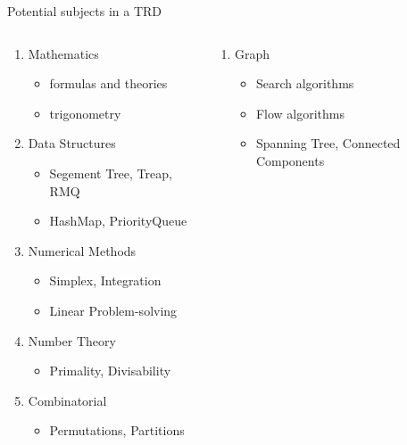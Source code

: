 \documentclass[11pt,pdf, aspectratio=169]{beamer}
\begin{document}
  \begin{frame}{Potential subjects in a TRD}
    \begin{columns}
      \begin{column}{.45\textwidth}
        \begin{enumerate}
          \item Mathematics
          \begin{itemize}
            \item formulas and theories
            \item trigonometry
          \end{itemize}
          \item Data Structures
          \begin{itemize}
            \item Segement Tree, Treap, RMQ
            \item HashMap, PriorityQueue
          \end{itemize}
          \item Numerical Methods
          \begin{itemize}
            \item Simplex, Integration
            \item Linear Problem-solving
          \end{itemize}
          \item Number Theory
          \begin{itemize}
            \item Primality, Divisability
          \end{itemize}
          \item Combinatorial
          \begin{itemize}
            \item Permutations, Partitions
          \end{itemize}
        \end{enumerate}
      \end{column}
      \begin{column}{.45\textwidth}
        \begin{enumerate}
          \addtocounter{enumi}{5}
          \item Graph
          \begin{itemize}
            \item Search algorithms
            \item Flow algorithms
            \item Spanning Tree, Connected Components

\end{itemize}
\end{enumerate}
\end{column}
\end{columns}
\end{frame}
\end{document}
